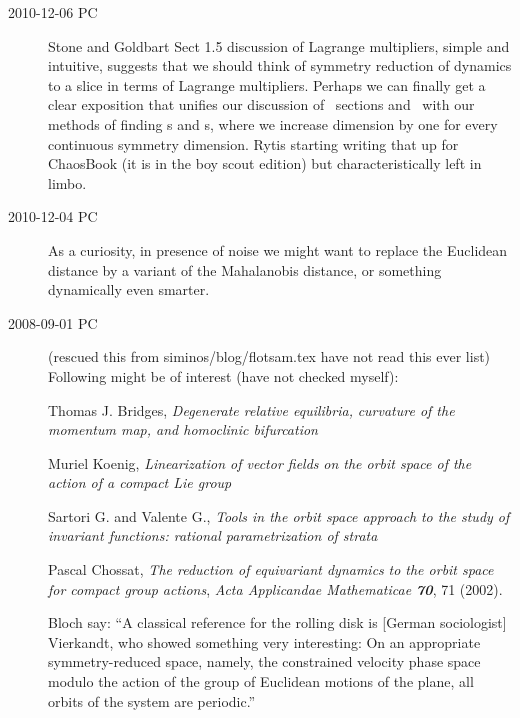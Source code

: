 \begin{description}
\item[2010-12-06 PC]
{Stone and Goldbart} Sect 1.5 discussion of Lagrange
multipliers, simple and intuitive, suggests that we should think of
symmetry reduction of dynamics to a slice in terms of Lagrange
multipliers. Perhaps we can finally get a clear exposition that unifies
our discussion of \Poincare\ sections and \reducedsp\ with our methods of
finding \po s and \rpo s, where we increase dimension by one for every
continuous symmetry dimension. Rytis starting writing that up for
ChaosBook (it is in the boy scout edition) but characteristically left in
limbo.

\item[2010-12-04 PC]
As a curiosity, in presence of noise we might want to replace the Euclidean
distance by a variant of the
{Mahalanobis distance}, or something dynamically even
smarter.

\item[2008-09-01 PC] (rescued this from siminos/blog/flotsam.tex
have not read this ever list)
Following might be of interest (have not checked myself):


\noindent
Thomas J. Bridges,
{\emph{Degenerate relative equilibria,}}
\emph{curvature of the momentum map, and homoclinic bifurcation}

Muriel Koenig,
{\emph{Linearization of vector fields}}
\emph{ on the orbit space of the action of a compact Lie group}

Sartori G. and Valente G.,
{\emph{Tools in the orbit space approach}}
\emph{to the study of invariant functions: rational parametrization of strata}

Pascal Chossat,
{\emph{The reduction of equivariant dynamics}}
\emph{to the orbit space for compact group actions},
{\em Acta Applicandae Mathematicae \bf 70}, 71 (2002). %

     {Bloch \etal} say:
``A classical reference for the rolling disk is [German
sociologist]
{Vierkandt}, who showed
something very interesting: On an appropriate
symmetry-reduced space, namely, the constrained velocity
phase space modulo the action of the group of Euclidean
motions of the plane, all orbits of the system are
periodic.''


\end{description}
